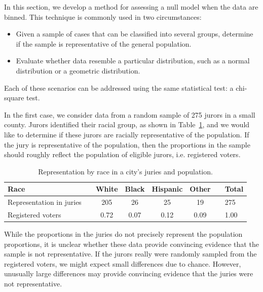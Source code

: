 In this section, we develop a method for assessing a null model when the data are binned.
This technique is commonly used in two circumstances:
\begin{itemize}
\setlength{\itemsep}{0mm}
\item Given a sample of cases that can be classified into several groups, determine if the sample is representative of the general population.
\item Evaluate whether data resemble a particular distribution, such as a normal distribution or a geometric distribution.
\end{itemize}
Each of these scenarios can be addressed using the same statistical test: a chi-square test.


In the first case, we consider data from a random sample of 275 jurors in a small county. Jurors identified their racial group, as shown in Table~\ref{juryRepresentationAndCityRepresentationForRace}, and we would like to determine if these jurors are racially representative of the population.  If the jury is representative of the population, then the proportions in the sample should roughly reflect the population of eligible jurors, i.e. registered voters.

\begin{table}[h]
\centering
\begin{tabular}{ll ccc c ll}
\hline
Race	 & \hspace{2mm} & White & Black & Hispanic & Other & \hspace{2mm} & Total \\
\hline
Representation in juries &	& 205 & 26 & 25 & 19 & & 275 \\
Registered voters	 & 		& 0.72 & 0.07 & 0.12 & 0.09 & & 1.00 \\
\hline
\end{tabular}
\caption{Representation by race in a city's juries and population.}
\label{juryRepresentationAndCityRepresentationForRace}
\end{table}

While the proportions in the juries do not precisely represent the population proportions, it is unclear whether these data provide convincing evidence that the sample is not representative. If the jurors really were randomly sampled from the registered voters, we might expect small differences due to chance. However, unusually large differences may provide convincing evidence that the juries were not representative.

